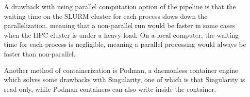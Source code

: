 \documentclass[11pt]{article}
\begin{document}
A drawback with using parallel computation option of the pipeline is that the waiting time on the SLURM cluster for each process slows down the parallelization, meaning that a non-parallel run would be faster in some cases when the HPC cluster is under a heavy load.
On a local computer, the waiting time for each process is negligible, meaning a parallel processing would always be faster than non-parallel.

Another method of containerization is Podman, a daemonless container engine which solves some drawbacks with Singularity, one of which is that Singularity is read-only, while Podman containers can also write inside the container.




\end{document}
